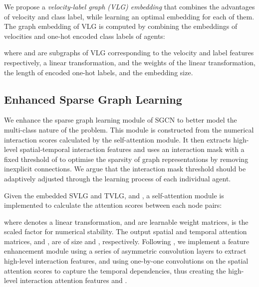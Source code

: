 \documentclass{article}
\begin{document}
We propose a \emph{velocity-label graph (VLG) embedding} that combines the advantages of velocity and class label, while learning an optimal embedding for each of them.
The graph embedding of VLG is computed by combining the embeddings of velocities and one-hot encoded class labels of agents:

where  and  are subgraphs of VLG corresponding to the velocity and label features respectively,
 a linear transformation,  and  the weights of the linear transformation,  the length of encoded one-hot labels, and  the embedding size.

























\subsection{Enhanced Sparse Graph Learning}
\label{sec:aim}
We enhance the sparse graph learning module of SGCN \cite{shi2021sgcn} to better model the multi-class nature of the problem. This module is constructed from the numerical interaction scores calculated by the self-attention module. It then extracts high-level spatial-temporal interaction features and uses an interaction mask with a fixed threshold of  to optimise the sparsity of graph representations by removing inexplicit connections. We argue that the interaction mask threshold should be adaptively adjusted through the learning process of each individual agent. 










Given the embedded SVLG and TVLG,  and ,
a self-attention module  \cite{Vaswani2017Transformer} is implemented to calculate the attention scores  between each node pairs:

where  denotes a linear transformation,  and  are learnable weight matrices,  is the scaled factor for numerical stability. The output spatial and temporal attention matrices,   and , are of size  and , respectively. 
Following \cite{shi2021sgcn}, we implement a feature enhancement module using a series of asymmetric convolution layers \cite{Szegedy2015AsyConv} to extract high-level interaction features, and using one-by-one convolutions on the spatial attention scores to capture the temporal dependencies, thus creating the high-level interaction attention features  and . 
\end{document}
